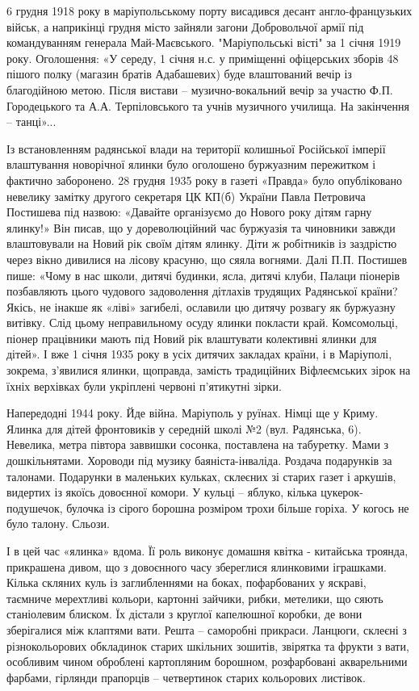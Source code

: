 6 грудня 1918 року в маріупольському порту висадився десант англо-французьких
військ, а наприкінці грудня місто зайняли загони Добровольчої армії під
командуванням генерала Май-Маєвського. "Маріупольські вісті" за 1 січня 1919
року. Оголошення: «У середу, 1 січня н.с. у приміщенні офіцерських зборів 48
пішого полку (магазин братів Адабашевих) буде влаштований вечір із благодійною
метою. Після вистави – музично-вокальний вечір за участю Ф.П. Городецького та
А.А. Терпіловського та учнів музичного училища. На закінчення – танці»...

Із встановленням радянської влади на території колишньої Російської імперії
влаштування новорічної ялинки було оголошено буржуазним пережитком і фактично
заборонено. 28 грудня 1935 року в газеті «Правда» було опубліковано невелику
замітку другого секретаря ЦК КП(б) України Павла Петровича Постишева під
назвою: «Давайте організуємо до Нового року дітям гарну ялинку!» Він писав, що
у дореволюційний час буржуазія та чиновники завжди влаштовували на Новий рік
своїм дітям ялинку. Діти ж робітників із заздрістю через вікно дивилися на
лісову красуню, що сяяла вогнями. Далі П.П. Постишев пише: «Чому в нас школи,
дитячі будинки, ясла, дитячі клуби, Палаци піонерів позбавляють цього чудового
задоволення дітлахів трудящих Радянської країни? Якісь, не інакше як «ліві»
загибелі, ославили цю дитячу розвагу як буржуазну витівку. Слід цьому
неправильному осуду ялинки покласти край. Комсомольці, піонер працівники мають
під Новий рік влаштувати колективні ялинки для дітей». І вже 1 січня 1935 року
в усіх дитячих закладах країни, і в Маріуполі, зокрема, з'явилися ялинки,
щоправда, замість традиційних Віфлеємських зірок на їхніх верхівках були
укріплені червоні п'ятикутні зірки.

Напередодні 1944 року. Йде війна. Маріуполь у руїнах. Німці ще у Криму. Ялинка
для дітей фронтовиків у середній школі №2 (вул. Радянська, 6). Невелика, метра
півтора заввишки сосонка, поставлена на табуретку. Мами з дошкільнятами.
Хороводи під музику баяніста-інваліда. Роздача подарунків за талонами.
Подарунки в маленьких кульках, склеєних зі старих газет і аркушів, видертих із
якоїсь довоєнної комори. У кульці – яблуко, кілька цукерок-подушечок, булочка
із сірого борошна розміром трохи більше горіха. У когось не було талону.
Сльози.

І в цей час «ялинка» вдома. Її роль виконує домашня квітка - китайська троянда,
прикрашена дивом, що з довоєнного часу збереглися ялинковими іграшками. Кілька
скляних куль із заглибленнями на боках, пофарбованих у яскраві, таємниче
мерехтливі кольори, картонні зайчики, рибки, метелики, що сяють станіолевим
блиском. Їх дістали з круглої капелюшної коробки, де вони зберігалися між
клаптями вати. Решта – саморобні прикраси. Ланцюги, склеєні з різнокольорових
обкладинок старих шкільних зошитів, звірятка та фрукти з вати, особливим чином
оброблені картопляним борошном, розфарбовані акварельними фарбами, гірлянди
прапорців – четвертинок старих кольорових листівок.

